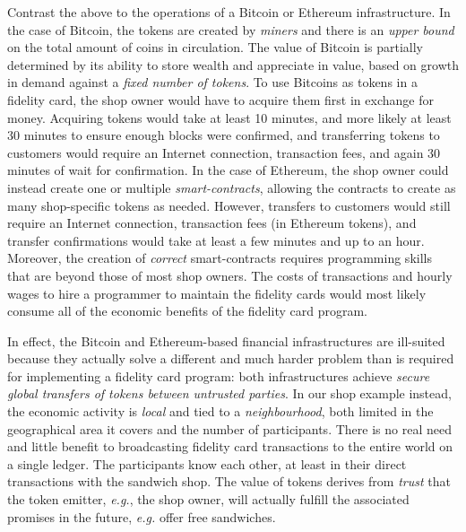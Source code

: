 \documentclass[sigplan,screen,10pt]{acmart}
\begin{document}
Contrast the above to the operations of a Bitcoin or Ethereum infrastructure. In the case of Bitcoin, the tokens are created by \textit{miners} and there is an \textit{upper bound} on the total amount of coins in circulation. 
The value of Bitcoin is partially determined by its ability to store wealth and appreciate in value, based on growth in demand against a \textit{fixed number of tokens}. To use Bitcoins as tokens in a fidelity card, the shop owner would have to acquire them first in exchange for money. Acquiring tokens would take at least 10 minutes, and more likely at least 30 minutes to ensure enough blocks were confirmed, and transferring tokens to customers would require an Internet connection, transaction fees, and again 30 minutes of wait for confirmation. In the case of Ethereum, the shop owner could instead create one or multiple \textit{smart-contracts}, allowing the contracts to create as many shop-specific tokens as needed. However, transfers to customers would still require an Internet connection, transaction fees (in Ethereum tokens), and transfer confirmations would take at least a few minutes and up to an hour. Moreover, the creation of \textit{correct} smart-contracts requires programming skills that are beyond those of most shop owners. The costs of transactions and hourly wages to hire a programmer to maintain the fidelity cards would most likely consume all of the economic benefits of the fidelity card program. %

In effect, the Bitcoin and Ethereum-based financial infrastructures are ill-suited because they actually solve a different and much harder problem than is required for implementing a fidelity card program: both infrastructures achieve \textit{secure global transfers of tokens between untrusted parties}. In our shop example instead, the economic activity is \textit{local} and tied to a \textit{neighbourhood}, both limited in the geographical area it covers and the number of participants. There is no real need and little benefit to broadcasting fidelity card transactions to the entire world on a single ledger. The participants know each other, at least in their direct transactions with the sandwich shop. The value of tokens derives from \textit{trust} that the token emitter, \textit{e.g.}, the shop owner, will actually fulfill the associated promises in the future, \textit{e.g.} offer free sandwiches. 
\end{document}
